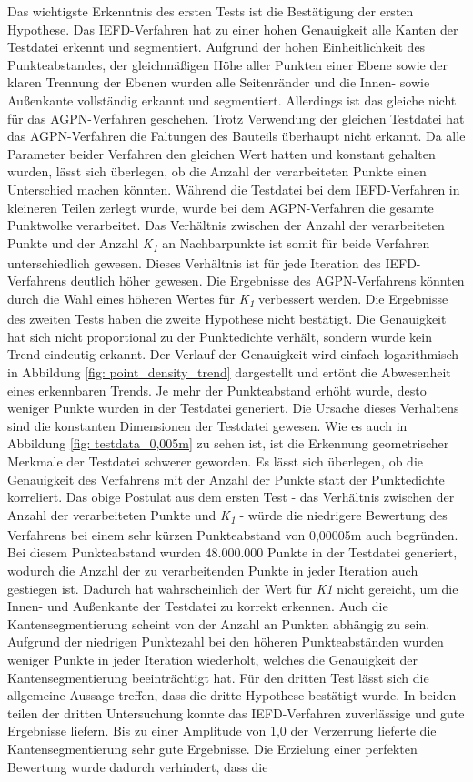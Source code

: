 Das wichtigste Erkenntnis des ersten Tests ist die Bestätigung der ersten Hypothese. Das IEFD-Verfahren hat zu einer hohen Genauigkeit alle Kanten der Testdatei erkennt und segmentiert. Aufgrund der hohen Einheitlichkeit des Punkteabstandes, der gleichmäßigen Höhe aller Punkten einer Ebene sowie der klaren Trennung der Ebenen wurden alle Seitenränder und die Innen- sowie Außenkante vollständig erkannt und segmentiert. Allerdings ist das gleiche nicht für das AGPN-Verfahren geschehen. Trotz Verwendung der gleichen Testdatei hat das AGPN-Verfahren die Faltungen des Bauteils überhaupt nicht erkannt. Da alle Parameter beider Verfahren den gleichen Wert hatten und konstant gehalten wurden, lässt sich überlegen, ob die Anzahl der verarbeiteten Punkte einen Unterschied machen könnten. Während die Testdatei bei dem IEFD-Verfahren in kleineren Teilen zerlegt wurde, wurde bei dem AGPN-Verfahren die gesamte Punktwolke verarbeitet. Das Verhältnis zwischen der Anzahl der verarbeiteten Punkte und der Anzahl \textit{K\textsubscript{1}} an Nachbarpunkte ist somit für beide Verfahren unterschiedlich gewesen. Dieses Verhältnis ist für jede Iteration des IEFD-Verfahrens deutlich höher gewesen. Die Ergebnisse des AGPN-Verfahrens könnten durch die Wahl eines höheren Wertes für \textit{K\textsubscript{1}} verbessert werden. Die Ergebnisse des zweiten Tests haben die zweite Hypothese nicht bestätigt. Die Genauigkeit hat sich nicht proportional zu der Punktedichte verhält, sondern wurde kein Trend eindeutig erkannt. Der Verlauf der Genauigkeit wird einfach logarithmisch in Abbildung \ref{fig: point_density_trend} dargestellt und ertönt die Abwesenheit eines erkennbaren Trends. Je mehr der Punkteabstand erhöht wurde, desto weniger Punkte wurden in der Testdatei generiert. Die Ursache dieses Verhaltens sind die konstanten Dimensionen der Testdatei gewesen. Wie es auch in Abbildung \ref{fig: testdata_0,005m} zu sehen ist, ist die Erkennung geometrischer Merkmale der Testdatei schwerer geworden. Es lässt sich überlegen, ob die Genauigkeit des Verfahrens mit der Anzahl der Punkte statt der Punktedichte korreliert. Das obige Postulat aus dem ersten Test - das Verhältnis zwischen der Anzahl der verarbeiteten Punkte und \textit{K\textsubscript{1}} - würde die niedrigere Bewertung des Verfahrens bei einem sehr kürzen Punkteabstand von 0,00005m auch begründen. Bei diesem Punkteabstand wurden 48.000.000 Punkte in der Testdatei generiert, wodurch die Anzahl der zu verarbeitenden Punkte in jeder Iteration auch gestiegen ist. Dadurch hat wahrscheinlich der Wert für \textit{K\textit{1}} nicht gereicht, um die Innen- und Außenkante der Testdatei zu korrekt erkennen. Auch die Kantensegmentierung scheint von der Anzahl an Punkten abhängig zu sein. Aufgrund der niedrigen Punktezahl bei den höheren Punkteabständen wurden weniger Punkte in jeder Iteration wiederholt, welches die Genauigkeit der Kantensegmentierung beeinträchtigt hat. Für den dritten Test lässt sich die allgemeine Aussage treffen, dass die dritte Hypothese bestätigt wurde. In beiden teilen der dritten Untersuchung konnte das IEFD-Verfahren zuverlässige und gute Ergebnisse liefern. Bis zu einer Amplitude von 1,0 der Verzerrung lieferte die Kantensegmentierung sehr gute Ergebnisse. Die Erzielung einer perfekten Bewertung wurde dadurch verhindert, dass die 